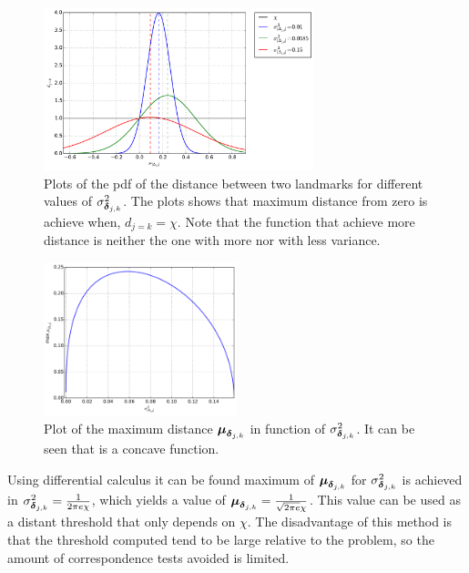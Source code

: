\begin{figure}[htbp!]
    \centering
    \includegraphics[width=0.7\textwidth]{imagenes/maxDistance.pdf}
    \caption{Plots of the pdf of the distance between two landmarks for different values of $\sigma_{\boldsymbol{\delta}_{j,k}}^2$. The plots shows that maximum distance from zero is achieve when, $d_{j=k}=\chi$. Note that the function that achieve more distance is neither the one with more nor with less variance.}
    \label{fig:max-distance}
\end{figure} 
\begin{figure}[htbp!]
    \centering
    \includegraphics[width=0.5\textwidth]{imagenes/maxVariance.pdf}
    \caption{Plot of the maximum distance $\boldsymbol{\mu}_{\boldsymbol{\delta}_{j,k}}$ in function of $\sigma_{\boldsymbol{\delta}_{j,k}}^2$. It can be seen that is a concave function.}
    \label{fig:max-variance}
\end{figure} 

Using differential calculus it can be found maximum of $\boldsymbol{\mu}_{\boldsymbol{\delta}_{j,k}}$ for $\sigma_{\boldsymbol{\delta}_{j,k}}^2$ is achieved in $\sigma_{\boldsymbol{\delta}_{j,k}}^2 = \frac{1}{2\pi e\chi}$, which yields a value of $\boldsymbol{\mu}_{\boldsymbol{\delta}_{j,k}} = \frac{1}{\sqrt{2\pi e}\chi}$.  
This value can be used as a distant threshold that only depends on $\chi$. The disadvantage of this method is that the threshold computed tend to be large relative to the problem, so the amount of correspondence tests avoided is limited.


